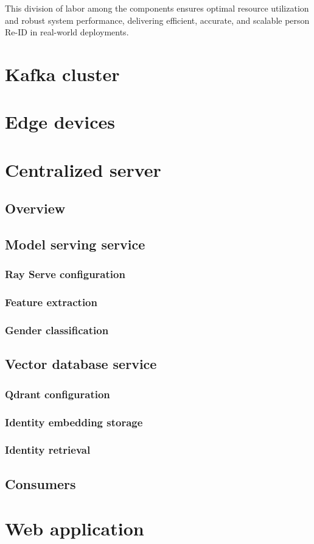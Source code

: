 \documentclass[../main.tex]{subfiles}
\begin{document}
This division of labor among the components ensures optimal resource utilization and robust system performance, delivering efficient, accurate, and scalable person Re-ID in real-world deployments.


\section{Kafka cluster}
\label{sec:kafka_cluster}



\section{Edge devices}
\label{sec:edge_devices}


\section{Centralized server}
\label{sec:centralized_server}

\subsection{Overview}

\subsection{Model serving service}

    \subsubsection{Ray Serve configuration}

    \subsubsection{Feature extraction}

    \subsubsection{Gender classification}

\subsection{Vector database service}

    \subsubsection{Qdrant configuration}

    \subsubsection{Identity embedding storage}

    \subsubsection{Identity retrieval}

\subsection{Consumers}

\section{Web application}
\end{document}
